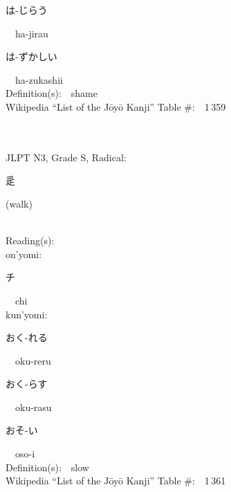 \begin{multicols}{2}
{\hspace*{2em}}{\begin{CJK}{UTF8}{min} は-じらう \end{CJK}}\ \ ha-jirau\ \ \\
{\hspace*{2em}}{\begin{CJK}{UTF8}{min} は-ずかしい \end{CJK}}\ \ ha-zukashii\ \ \\
Definition(s):\ \ shame \\
Wikipedia ``List of the J\=oy\=o Kanji'' Table \#:\ \ 1\,359 \\
\ \ \\
{\fontsize{34pt}{40pt}  }\ \ \\  %
{JLPT N3, Grade S, Radical:\ \ {\begin{CJK}{UTF8}{min} 辵 \end{CJK}} (walk) } \\
Reading(s):\ \ \\
{\hspace*{1em}}on'yomi:\ \ \\
{\hspace*{2em}}{\begin{CJK}{UTF8}{min} チ \end{CJK}}\ \ chi\ \ \\
{\hspace*{1em}}kun'yomi:\ \ \\
{\hspace*{2em}}{\begin{CJK}{UTF8}{min} おく-れる \end{CJK}}\ \ oku-reru\ \ \\
{\hspace*{2em}}{\begin{CJK}{UTF8}{min} おく-らす \end{CJK}}\ \ oku-rasu\ \ \\
{\hspace*{2em}}{\begin{CJK}{UTF8}{min} おそ-い \end{CJK}}\ \ oso-i\ \ \\
Definition(s):\ \ slow \\
Wikipedia ``List of the J\=oy\=o Kanji'' Table \#:\ \ 1\,361 \\
\ \ \\

\end{multicols}

